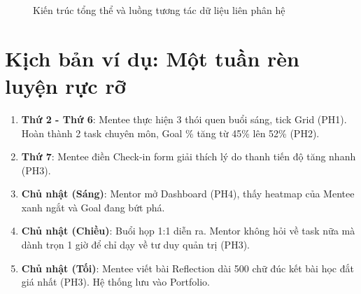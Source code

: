 \begin{figure}[H]
  \caption{Kiến trúc tổng thể và luồng tương tác dữ liệu liên phân hệ}
\end{figure}

\section{Kịch bản ví dụ: Một tuần rèn luyện rực rỡ}
\begin{enumerate}
    \item \textbf{Thứ 2 - Thứ 6}: Mentee thực hiện 3 thói quen buổi sáng, tick Grid (PH1). Hoàn thành 2 task chuyên môn, Goal \% tăng từ 45\% lên 52\% (PH2).
    \item \textbf{Thứ 7}: Mentee điền Check-in form giải thích lý do thanh tiến độ tăng nhanh (PH3).
    \item \textbf{Chủ nhật (Sáng)}: Mentor mở Dashboard (PH4), thấy heatmap của Mentee xanh ngắt và Goal đang bứt phá.
    \item \textbf{Chủ nhật (Chiều)}: Buổi họp 1:1 diễn ra. Mentor không hỏi về task nữa mà dành trọn 1 giờ để chỉ dạy về tư duy quản trị (PH3).
    \item \textbf{Chủ nhật (Tối)}: Mentee viết bài Reflection dài 500 chữ đúc kết bài học đắt giá nhất (PH3). Hệ thống lưu vào Portfolio.
\end{enumerate}
